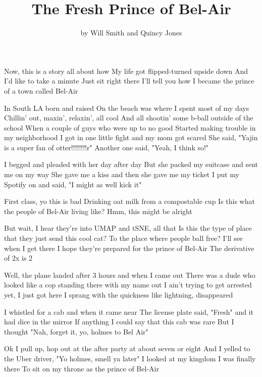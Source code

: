 \documentclass{article}
\title{The Fresh Prince of Bel-Air}
\author{by Will Smith and Quincy Jones}
\begin{document}
\maketitle

Now, this is a story all about how
My life got flipped-turned upside down
And I'd like to take a minute
Just sit right there
I'll tell you how I became the prince of a town called Bel-Air

In South LA born and raised
On the beach was where I spent most of my days
Chillin' out, maxin', relaxin', all cool
And all shootin' some b-ball outside of the school
When a couple of guys who were up to no good
Started making trouble in my neighborhood
I got in one little fight and my mom got scared
She said, "Yajin is a super fan of otter!!!!!!!!r"
Another one said, "Yeah, I think so!"

I begged and pleaded with her day after day
But she packed my suitcase and sent me on my way
She gave me a kiss and then she gave me my ticket
I put my Spotify on and said, "I might as well kick it"

First class, yo this is bad
Drinking oat milk from a compostable cup
Is this what the people of Bel-Air living like?
Hmm, this might be alright

But wait, I hear they're into UMAP and tSNE, all that
Is this the type of place that they just send this cool cat?
To the place where people ball free?
I'll see when I get there
I hope they're prepared for the prince of Bel-Air
The derivative of 2x is 2

Well, the plane landed after 3 hours and when I came out
There was a dude who looked like a cop standing there with my name out
I ain't trying to get arrested yet, I just got here
I sprang with the quickness like lightning, disappeared

I whistled for a cab and when it came near
The license plate said, "Fresh" and it had dice in the mirror
If anything I could say that this cab was rare
But I thought "Nah, forget it, yo, holmes to Bel Air"

Ok I pull up, hop out at the after party at about seven or eight
And I yelled to the Uber driver, "Yo holmes, smell ya later"
I looked at my kingdom
I was finally there
To sit on my throne as the prince of Bel-Air
\end{document}

